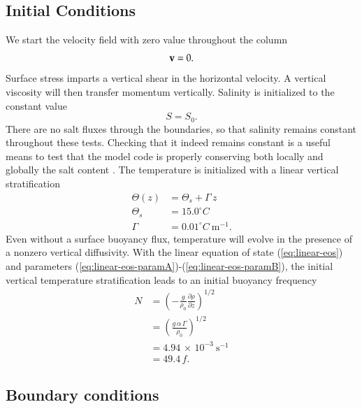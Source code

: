 \subsection{Initial Conditions}

We start the velocity field with zero value throughout the column
\begin{equation}
 {\bf v} = 0.
\end{equation}
Surface stress imparts a vertical shear in the horizontal velocity.  A
vertical viscosity will then transfer momentum vertically.  Salinity
is initialized to the constant value
\begin{equation}
 S = S_{0}.
\end{equation}
There are no salt fluxes through the boundaries, so that salinity
remains constant throughout these tests.  Checking that it indeed
remains constant is a useful means to test that the model code is
properly conserving both locally and globally the salt content
\citep{GriffiesPacSchmidtBalaji2001}.  The temperature is initialized
with a linear vertical stratification
\begin{subequations}
\begin{align}
 \Theta(z) &= \Theta_s + \Gamma \, z  
\\
 \Theta_s &= 15.0^{\circ}C 
\label{eq:thetas}
\\
 \Gamma  &= 0.01^{\circ}C~\mbox{m}^{-1}. 
\end{align}
\end{subequations}
Even without a surface buoyancy flux, temperature will evolve in the
presence of a nonzero vertical diffusivity.  With the linear equation
of state (\ref{eq:linear-eos}) and parameters
(\ref{eq:linear-eos-paramA})-(\ref{eq:linear-eos-paramB}), the initial
vertical temperature stratification leads to an initial buoyancy
frequency
\begin{subequations}
\begin{align}
 N &= \left(-\frac{g}{\rho_{0}} \frac{\partial \rho}{\partial z} \right)^{1/2}
 \\
   &= \left( \frac{g \, \alpha \, \Gamma}{\rho_{0}} \right)^{1/2}
\\
  &= 4.94 \, \times \, 10^{-3}~\mbox{s}^{-1}
 \\
 &= 49.4 \, f.
\end{align}
\end{subequations}


\subsection{Boundary conditions}


